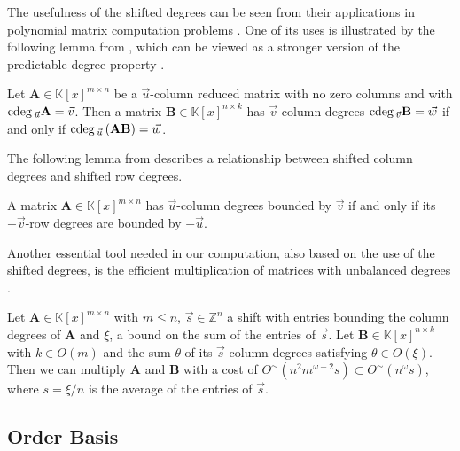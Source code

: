 The usefulness of the shifted degrees can be seen from their applications
in polynomial matrix computation problems \cite{ZL2012,za2012}. One
of its uses is illustrated by the following lemma from \cite[Chapter 2]{zhou:phd2012},
which can be viewed as a stronger version of the predictable-degree
property \cite{kailath:1980}. 
\begin{lem}
\label{lem:predictableDegree}Let $\mathbf{A}\in\mathbb{K}\left[x\right]^{m\times n}$
be a $\vec{u}$-column reduced matrix with no zero columns and with
${\rm cdeg}\,_{\vec{u}}\mathbf{A}=\vec{v}$. Then a matrix $\mathbf{B}\in\mathbb{K}\left[x\right]^{n\times k}$
has $\vec{v}$-column degrees ${\rm cdeg}\,_{\vec{v}}\mathbf{B}=\vec{w}$
if and only if ${\rm cdeg}\,_{\vec{u}}\left(\mathbf{A}\mathbf{B}\right)=\vec{w}$. 
\end{lem}
The following lemma from \cite[Chapter 2]{zhou:phd2012} describes
a relationship between shifted column degrees and shifted row degrees.
\begin{lem}
\label{lem:columnDegreesRowDegreesSymmetry}A matrix $\mathbf{A}\in\mathbb{K}\left[x\right]^{m\times n}$
has $\vec{u}$-column degrees bounded by $\vec{v}$ if and only if
its $-\vec{v}$-row degrees are bounded by $-\vec{u}$. 
\end{lem}
Another essential tool needed in our computation, also based on the
use of the shifted degrees, is the efficient multiplication of matrices
with unbalanced degrees \cite[Theorem 3.7]{za2012}. 
\begin{thm}
\label{thm:multiplyUnbalancedMatrices} Let $\mathbf{A}\in\mathbb{K}\left[x\right]^{m\times n}$
with $m\le n$, $\vec{s}\in\mathbb{Z}^{n}$ a shift with entries bounding
the column degrees of $\mathbf{A}$ and $\xi$, a bound on the sum
of the entries of $\vec{s}$. Let $\mathbf{B}\in\mathbb{K}\left[x\right]^{n\times k}$
with $k\in O\left(m\right)$ and the sum $\theta$ of its $\vec{s}$-column
degrees satisfying $\theta\in O\left(\xi\right)$. Then we can multiply
$\mathbf{A}$ and $\mathbf{B}$ with a cost of $O^{\sim}(n^{2}m^{\omega-2}s)\subset O^{\sim}(n^{\omega}s)$,
where $s=\xi/n$ is the average of the entries of $\vec{s}$. 
\end{thm}

\subsection{Order Basis}

